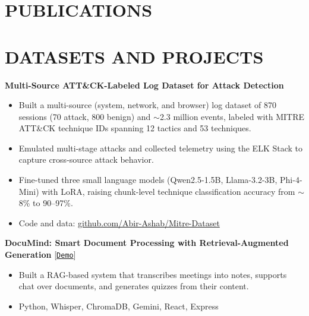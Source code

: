 \documentclass[11pt, letterpaper]{article}
\newcommand{\dated}[2]{#1{\unskip\nobreak\hfil\penalty50\hskip1.5em\hbox{}\nobreak\hfil\textit{#2}%
    \parfillskip=0pt\finalhyphendemerits=0\par}}
\newcommand{\bracketlink}[2]{[\href{#1}{#2}]}
\begin{document}
\section{PUBLICATIONS}


\section{DATASETS AND PROJECTS}

\textbf{Multi-Source ATT\&CK-Labeled Log Dataset for Attack Detection}
\begin{itemize}
    \item Built a multi-source (system, network, and browser) log dataset of 870 sessions (70 attack, 800 benign) and $\sim$2.3 million events, labeled with MITRE ATT\&CK technique IDs spanning 12 tactics and 53 techniques.
    \item Emulated multi-stage attacks and collected telemetry using the ELK Stack to capture cross-source attack behavior.
    \item Fine-tuned three small language models (Qwen2.5-1.5B, Llama-3.2-3B, Phi-4-Mini) with LoRA, raising chunk-level technique classification accuracy from $\sim$8\% to 90--97\%.
    \item Code and data: \href{https://github.com/Abir-Ashab/Mitre-Dataset}{github.com/Abir-Ashab/Mitre-Dataset}
\end{itemize}

\vspace{0.2cm}
\textbf{DocuMind: Smart Document Processing with Retrieval-Augmented Generation} \bracketlink{https://drive.google.com/file/d/1ahMOqGuAlwxh5buA5cbAAivj0Nijc3rU/view?usp=drive_link}{\texttt{Demo}}
\begin{itemize}
    \item Built a RAG-based system that transcribes meetings into notes, supports chat over documents, and generates quizzes from their content.
    \item Python, Whisper, ChromaDB, Gemini, React, Express
\end{itemize}
\end{document}
